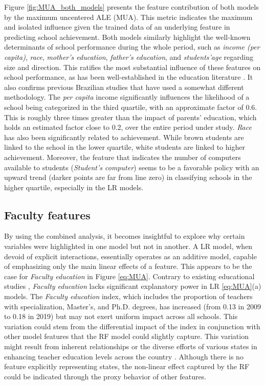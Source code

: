 Figure \ref{fig:MUA_both_models} presents the feature contribution of both models by the maximum uncentered ALE (MUA). This metric indicates the maximum and isolated influence given the trained data of an underlying feature in predicting school achievement. Both models similarly highlight the well-known determinants of school performance during the whole period, such as \textit{income (per capita)}, \textit{race}, \textit{mother’s education}, \textit{father’s education}, and \textit{students’age} regarding size and direction. This ratifies the most substantial influence of these features on school performance, as has been well-established in the education literature \cite{doi:10.1080/00220671.1997.10544583,   coleman1968equality, coleman2019equality}. It also confirms previous Brazilian studies \cite{Carnoy2022TrendsBrazil} that have used a somewhat different methodology. The \textit{per capita} income significantly influences the likelihood of a school being categorized in the third quartile, with an approximate factor of 0.6. This is roughly three times greater than the impact of parents' education, which holds an estimated factor close to 0.2, over the entire period under study. \textit{Race} has also been significantly related to achievement. While brown students are linked to the school in the lower quartile, white students are linked to higher achievement. Moreover, the feature that indicates the number of computers available to students (\textit{Student's computer}) seems to be a favorable policy with an upward trend (darker points are far from line zero) in classifying schools in the higher quartile, especially in the LR models.

\subsection{Faculty features}

By using the combined analysis, it becomes insightful to explore why certain variables were highlighted in one model but not in another. A LR model, when devoid of explicit interactions, essentially operates as an additive model, capable of emphasizing only the main linear effects of a feature. This appears to be the case for \textit{Faculty education} in Figure \ref{eq:MUA}. Contrary to existing educational studies \cite{doi:10.1080/00220671.1997.10544583, Darling-Hammond2000HowMatters}, \textit{Faculty education} lacks significant explanatory power in LR \ref{eq:MUA}(a) models. The \textit{Faculty education} index, which includes the proportion of teachers with specialization, Master's, and Ph.D. degrees, has increased (from 0.13 in 2009 to 0.18 in 2019) but may not exert uniform impact across all schools. This variation could stem from the differential impact of the index in conjunction with other model features that the RF model could slightly capture. This variation might result from inherent relationships or the diverse efforts of various states in enhancing teacher education levels across the country \cite{SilvaFilho2023LeveragingEducation}. Although there is no feature explicitly representing states, the non-linear effect captured by the RF could be indicated through the proxy behavior of other features.


